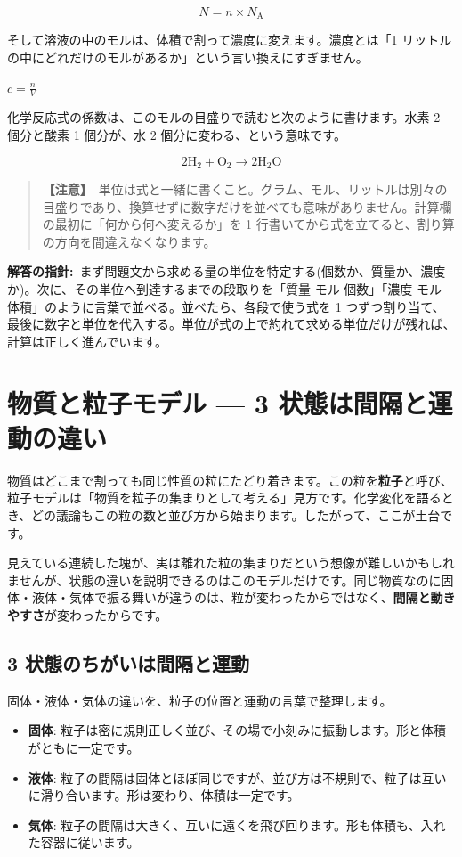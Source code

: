 \documentclass{article}
\begin{document}
\[ N = n \times N_{\mathrm{A}} \]

そして溶液の中のモルは、体積で割って濃度に変えます。濃度とは「1 リットルの中にどれだけのモルがあるか」という言い換えにすぎません。

\(c = \frac{n}{V}\)

化学反応式の係数は、このモルの目盛りで読むと次のように書けます。水素 2 個分と酸素 1 個分が、水 2 個分に変わる、という意味です。

\[ 2\mathrm{H}_{2} + \mathrm{O}_{2} \rightarrow 2\mathrm{H}_{2}\mathrm{O} \]

\begin{quote}
\textbf{【注意】}\ 単位は式と一緒に書くこと。グラム、モル、リットルは別々の目盛りであり、換算せずに数字だけを並べても意味がありません。計算欄の最初に「何から何へ変えるか」を 1 行書いてから式を立てると、割り算の方向を間違えなくなります。
\end{quote}

\textbf{解答の指針:}\ まず問題文から求める量の単位を特定する(個数か、質量か、濃度か)。次に、その単位へ到達するまでの段取りを「質量 モル 個数」「濃度 モル 体積」のように言葉で並べる。並べたら、各段で使う式を 1 つずつ割り当て、最後に数字と単位を代入する。単位が式の上で約れて求める単位だけが残れば、計算は正しく進んでいます。

\section{物質と粒子モデル — 3 状態は間隔と運動の違い}

物質はどこまで割っても同じ性質の粒にたどり着きます。この粒を\textbf{粒子}と呼び、粒子モデルは「物質を粒子の集まりとして考える」見方です。化学変化を語るとき、どの議論もこの粒の数と並び方から始まります。したがって、ここが土台です。

見えている連続した塊が、実は離れた粒の集まりだという想像が難しいかもしれませんが、状態の違いを説明できるのはこのモデルだけです。同じ物質なのに固体・液体・気体で振る舞いが違うのは、粒が変わったからではなく、\textbf{間隔と動きやすさ}が変わったからです。

\subsection{3 状態のちがいは間隔と運動}

固体・液体・気体の違いを、粒子の位置と運動の言葉で整理します。

\begin{itemize}
\item \textbf{固体}: 粒子は密に規則正しく並び、その場で小刻みに振動します。形と体積がともに一定です。
\item \textbf{液体}: 粒子の間隔は固体とほぼ同じですが、並び方は不規則で、粒子は互いに滑り合います。形は変わり、体積は一定です。
\item \textbf{気体}: 粒子の間隔は大きく、互いに遠くを飛び回ります。形も体積も、入れた容器に従います。
\end{itemize}
\end{document}
